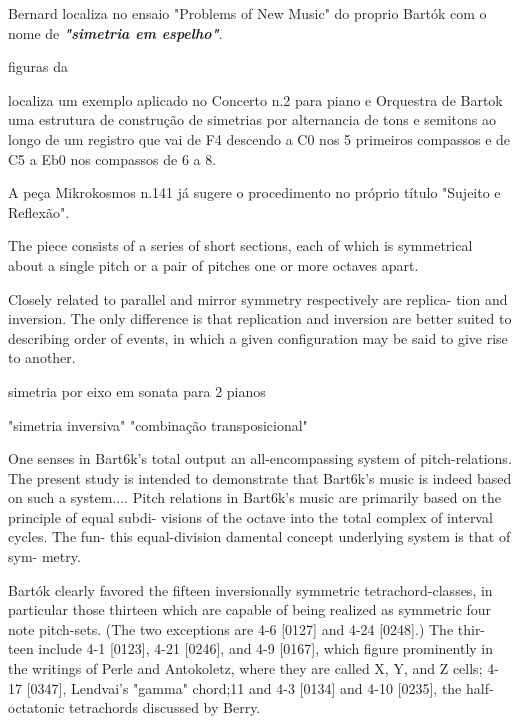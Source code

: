 \documentclass[
	12pt,				%
	openright,			%
	twoside,			%
	a4paper,			%
	english,			%
	french,				%
	spanish,			%
	brazil				%
	]{abntex2}
\begin{document}
Bernard localiza no ensaio "Problems of New Music" do proprio Bartók com o nome de \textit{\textbf{"simetria em espelho"}}.


figuras da  \cite[p. 187]{bernard1986space}

 localiza um exemplo aplicado no Concerto n.2 para piano e Orquestra de Bartok uma estrutura de construção de simetrias por alternancia de tons e semitons ao longo de um registro que vai de F4 descendo a C0 nos 5 primeiros compassos e de C5 a Eb0 nos compassos de 6 a 8.

A peça Mikrokosmos n.141 já sugere o procedimento no próprio título "Sujeito e Reflexão".

The piece consists of a series of short sections, each of which is symmetrical about a single
pitch or a pair of pitches one or more octaves apart.\cite[p. 187]{bernard1986space}

Closely related to parallel and mirror symmetry respectively are replica-
tion and inversion. The only difference is that replication and inversion are
better suited to describing order of events, in which a given configuration
may be said to give rise to another.\cite[p. 190]{bernard1986space}


simetria por eixo em sonata para 2 pianos \cite[p. 195-198]{bernard1986space}



"simetria inversiva"
"combinação transposicional"
\cite{cohn1988inversional}

One senses in Bart6k's total output an all-encompassing
system of pitch-relations. The present study is intended to demonstrate that
Bart6k's music is indeed based on such a system.... Pitch relations
in Bart6k's music are primarily
based on the principle of equal subdi-
visions of the octave into the total complex of interval cycles. The fun-
this equal-division
damental concept underlying
system is that of sym-
metry.


Bartók clearly favored the fifteen inversionally
symmetric tetrachord-classes, in particular those thirteen which
are capable of being realized as symmetric four note pitch-sets.
(The two exceptions are 4-6 [0127] and 4-24 [0248].) The thir-
teen include 4-1 [0123], 4-21 [0246], and 4-9 [0167], which figure
prominently in the writings of Perle and Antokoletz, where
they are called X, Y, and Z cells; 4-17 [0347], Lendvai's
"gamma" chord;11 and 4-3 [0134] and 4-10 [0235], the half-
octatonic tetrachords discussed by Berry.
\end{document}
